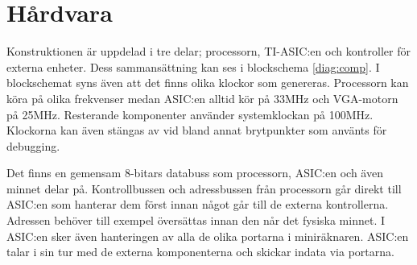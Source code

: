 \documentclass[main.tex]{subfiles}
\begin{document}
\section{Hårdvara}
Konstruktionen är uppdelad i tre delar; processorn, TI-ASIC:en och kontroller
för externa enheter. Dess sammansättning kan ses i blockschema \ref{diag:comp}.
I blockschemat syns även att det finns olika klockor som genereras. Processorn
kan köra på olika frekvenser medan ASIC:en alltid kör på 33MHz och VGA-motorn
på 25MHz. Resterande komponenter använder systemklockan på 100MHz. Klockorna
kan även stängas av vid bland annat brytpunkter som använts för debugging.

Det finns en gemensam 8-bitars databuss som processorn, ASIC:en och även minnet
delar på. Kontrollbussen och adressbussen från processorn går direkt till
ASIC:en som hanterar dem först innan något går till de externa kontrollerna.
Adressen behöver till exempel översättas innan den når det fysiska minnet. I
ASIC:en sker även hanteringen av alla de olika portarna i miniräknaren. ASIC:en
talar i sin tur med de externa komponenterna och skickar indata via portarna.




\end{document}

